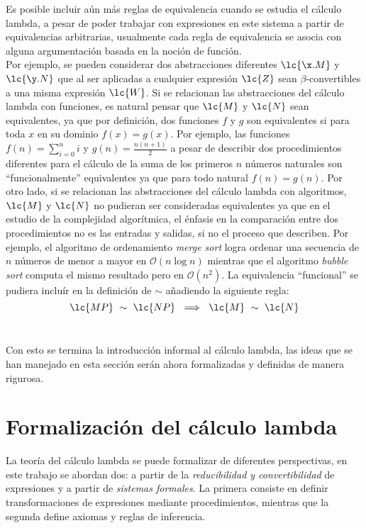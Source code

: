 Es posible incluir aún más reglas de equivalencia cuando se estudia el cálculo
lambda, a pesar de poder trabajar con expresiones en este sistema a partir de
equivalencias arbitrarias, usualmente cada regla de equivalencia se asocia
con alguna argumentación basada en la noción de función. \\

Por ejemplo, se pueden considerar dos abstracciones diferentes \(\lc{\x.M}\) y
\(\lc{\y.N}\) que al ser aplicadas a cualquier expresión \(\lc{Z}\) sean
\(\beta\)-convertibles a una misma expresión \(\lc{W}\). Si se relacionan las
abstracciones del cálculo lambda con funciones, es natural pensar que \(\lc{M}\)
y \(\lc{N}\) sean equivalentes, ya que por definición, dos funciones \(f\) y
\(g\) son equivalentes si para toda \(x\) en su dominio \(f(x)=g(x)\). Por
ejemplo, las funciones \(f(n)=\sum_{i=0}^{n}i\) y \(g(n)=\frac{n(n+1)}{2}\) a
pesar de describir dos procedimientos diferentes para el cálculo de la suma de
los primeros \(n\) números naturales son ``funcionalmente'' equivalentes ya que
para todo natural \(f(n)=g(n)\). Por otro lado, si se relacionan las
abstracciones del cálculo lambda con algoritmos, \(\lc{M}\) y \(\lc{N}\) no
pudieran ser consideradas equivalentes ya que en el estudio de la complejidad
algorítmica, el énfasis en la comparación entre dos procedimientos no es las
entradas y salidas, si no el proceso que describen. Por ejemplo, el algoritmo de
ordenamiento \emph{merge sort} logra ordenar una secuencia de \(n\) números de
menor a mayor en \(\mathcal{O}(n \log n)\) mientras que el algoritmo
\emph{bubble sort} computa el mismo resultado pero en \(\mathcal{O}(n^2)\).
La equivalencia ``funcional'' se pudiera incluír en la definición de \(\sim\)
añadiendo la siguiente regla: \\

\[\lc{M P}\ \sim\ \lc{N P}\ \implies\ \lc{M}\ \sim\ \lc{N}\] \

Con esto se termina la introducción informal al cálculo lambda, las ideas que se
han manejado en esta sección serán ahora formalizadas y definidas de manera
rigurosa. \\

\section{Formalización del cálculo lambda}

La teoría del cálculo lambda se puede formalizar de diferentes perspectivas, en
este trabajo se abordan dos: a partir de la \emph{reducibilidad y
  convertibilidad} de expresiones y a partir de \emph{sistemas formales}. La
primera consiste en definir transformaciones de expresiones mediante
procedimientos, mientras que la segunda define axiomas y reglas de inferencia. \\

